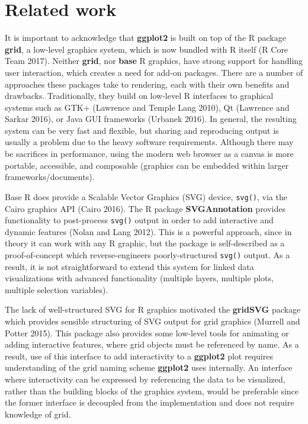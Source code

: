 \documentclass[12pt,]{article}
\theoremstyle{definition}
\theoremstyle{definition}
\theoremstyle{definition}
\theoremstyle{remark}
\begin{document}
\hypertarget{related-work}{%
\section{Related work}\label{related-work}}

It is important to acknowledge that \textbf{ggplot2} is built on top of
the R package \textbf{grid}, a low-level graphics system, which is now
bundled with R itself (R Core Team 2017). Neither \textbf{grid}, nor
\textbf{base} R graphics, have strong support for handling user
interaction, which creates a need for add-on packages. There are a
number of approaches these packages take to rendering, each with their
own benefits and drawbacks. Traditionally, they build on low-level R
interfaces to graphical systems such as GTK+ (Lawrence and Temple Lang
2010), Qt (Lawrence and Sarkar 2016), or Java GUI frameworks (Urbanek
2016). In general, the resulting system can be very fast and flexible,
but sharing and reproducing output is usually a problem due to the heavy
software requirements. Although there may be sacrifices in performance,
using the modern web browser as a canvas is more portable, accessible,
and composable (graphics can be embedded within larger
frameworks/documents).

Base R does provide a Scalable Vector Graphics (SVG) device,
\texttt{svg()}, via the Cairo graphics API (Cairo 2016). The R package
\textbf{SVGAnnotation} provides functionality to post-process
\texttt{svg()} output in order to add interactive and dynamic features
(Nolan and Lang 2012). This is a powerful approach, since in theory it
can work with any R graphic, but the package is self-described as a
proof-of-concept which reverse-engineers poorly-structured
\texttt{svg()} output. As a result, it is not straightforward to extend
this system for linked data visualizations with advanced functionality
(multiple layers, multiple plots, multiple selection variables).

The lack of well-structured SVG for R graphics motivated the
\textbf{gridSVG} package which provides sensible structuring of SVG
output for grid graphics (Murrell and Potter 2015). This package also
provides some low-level tools for animating or adding interactive
features, where grid objects must be referenced by name. As a result,
use of this interface to add interactivity to a \textbf{ggplot2} plot
requires understanding of the grid naming scheme \textbf{ggplot2} uses
internally. An interface where interactivity can be expressed by
referencing the data to be visualized, rather than the building blocks
of the graphics system, would be preferable since the former interface
is decoupled from the implementation and does not require knowledge of
grid.
\end{document}
